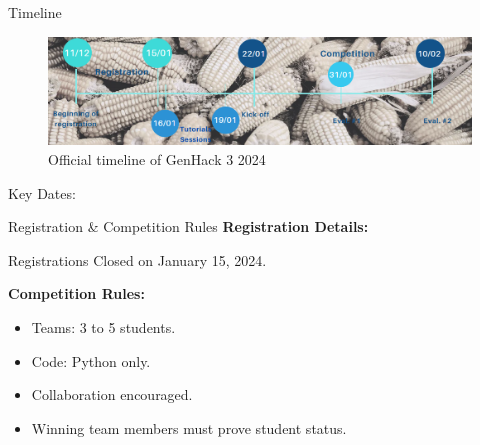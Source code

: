 \documentclass[final]{beamer}
\newlength{\colwidth}
\begin{document}
\begin{frame}[t]
\begin{columns}[t]
\begin{column}{\colwidth}
    \begin{block}{Timeline}
        \begin{figure}
            \centering
            \includegraphics[width=\columnwidth]{figures/2024-Timeline_2.png}
            \caption{Official timeline of GenHack 3 2024 \cite{polytechniqueGenhackHackathon}}
            \label{fig:ftcat}
        \end{figure}
        Key Dates:
    \end{block}

    \begin{block}{Registration \& Competition Rules}
        \textbf{Registration Details:}
        \begin{itemize}
            \itexm Registrations Closed on January 15, 2024.
        \end{itemize}
        
        \textbf{Competition Rules:}
        \begin{itemize}
            \item Teams: 3 to 5 students.
            \item Code: Python only.
            \item Collaboration encouraged.
            \item Winning team members must prove student status.
        \end{itemize}
    
    \end{block}
\end{column}


\end{columns}
\end{frame}
\end{document}
